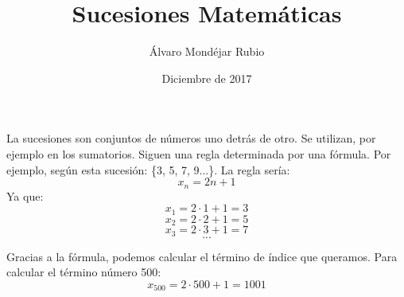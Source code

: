 \documentclass{article}
\title{Sucesiones Matemáticas}
\author{Álvaro Mondéjar Rubio}
\date{Diciembre de 2017}
\begin{document}
\maketitle

La sucesiones son conjuntos de números uno detrás de otro. Se utilizan, por ejemplo en los sumatorios.
Siguen una regla determinada por una fórmula. Por ejemplo, según esta sucesión: \{3, 5, 7, 9...\}. La regla sería:
\[ x_n = 2n + 1 \]
Ya que: 
\[ x_1 = 2 \cdot 1 + 1 = 3 \]
\[ x_2 = 2 \cdot 2 + 1 = 5 \]
\[ x_3 = 2 \cdot 3 + 1 = 7 \]
\[ ... \]

Gracias a la fórmula, podemos calcular el término de índice que queramos. Para calcular el término número 500:
\[ x_{500} = 2 \cdot 500 + 1 = 1001 \]
\end{document}

